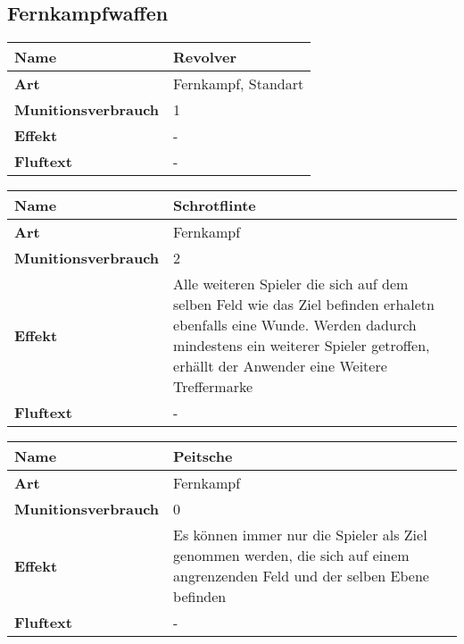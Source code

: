 


\subsection{Fernkampfwaffen}


\begin{table}[H]
  \begin{center}
    \label{tab:table1}
    \begin{tabular}{|l|p{8cm}|}
      \hline
      \textbf{Name} & Revolver \\
      \hline
      \textbf{Art} & Fernkampf, Standart \\
      \hline
      \textbf{Munitionsverbrauch} & 1 \\
      \hline
      \textbf{Effekt} & - \\
      \hline
      \textbf{Fluftext} & - \\
      \hline
    \end{tabular}
  \end{center}
\end{table}

\begin{table}[H]
  \begin{center}
    \label{tab:table1}
    \begin{tabular}{|l|p{8cm}|}
      \hline
      \textbf{Name} & Schrotflinte \\
      \hline
      \textbf{Art} & Fernkampf \\
      \hline
      \textbf{Munitionsverbrauch} & 2 \\
      \hline
      \textbf{Effekt} & Alle weiteren Spieler die sich auf dem selben Feld wie das Ziel befinden erhaletn
                        ebenfalls eine Wunde. Werden dadurch mindestens ein weiterer Spieler getroffen,
                        erhällt der Anwender eine Weitere Treffermarke \\
      \hline
      \textbf{Fluftext} & - \\
      \hline
    \end{tabular}
  \end{center}
\end{table}

\begin{table}[H]
  \begin{center}
    \label{tab:table1}
    \begin{tabular}{|l|p{8cm}|}
      \hline
      \textbf{Name} & Peitsche \\
      \hline
      \textbf{Art} & Fernkampf \\
      \hline
      \textbf{Munitionsverbrauch} & 0 \\
      \hline
      \textbf{Effekt} & Es können immer nur die Spieler als Ziel genommen werden, die sich auf einem angrenzenden Feld
                        und der selben Ebene befinden\\
      \hline
      \textbf{Fluftext} & - \\
      \hline
    \end{tabular}
  \end{center}
\end{table}

